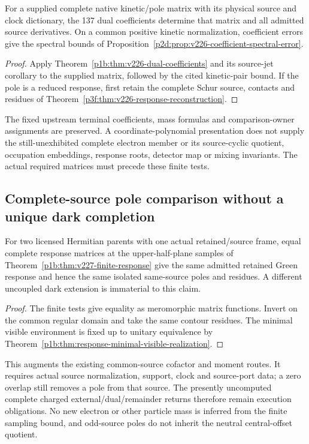 \documentclass[12pt,a4paper]{article}
\begin{document}
\begin{corollary}
\label{p5b:cor:v226-pole-coefficients}
For a supplied complete native kinetic/pole matrix with its physical source
and clock dictionary, the 137 dual coefficients determine that matrix and
all admitted source derivatives. On a common positive kinetic normalization,
coefficient errors give the spectral bounds of
Proposition~\ref{p2d:prop:v226-coefficient-spectral-error}.
\end{corollary}
\begin{proof}
Apply Theorem~\ref{p1b:thm:v226-dual-coefficients} and its source-jet
corollary to the supplied matrix, followed by the cited kinetic-pair bound.
If the pole is a reduced response, first retain the complete Schur source,
contacts and residues of Theorem~\ref{p3f:thm:v226-response-reconstruction}.
\end{proof}
The fixed upstream terminal coefficients, mass formulas and comparison-owner
assignments are preserved. A coordinate-polynomial presentation does not
supply the still-unexhibited complete electron member or its source-cyclic
quotient, occupation embeddings, response roots, detector map or mixing
invariants. The actual required matrices must precede these finite tests.


\subsection{Complete-source pole comparison without a unique dark completion}
\label{p5b:sec:v227-pole-comparison}
\begin{corollary}
\label{p5b:cor:v227-pole-comparison}
For two licensed Hermitian parents with one actual retained/source frame,
equal complete response matrices at the upper-half-plane samples of
Theorem~\ref{p1b:thm:v227-finite-response} give the same admitted retained
Green response and hence the same isolated same-source poles and residues.
A different uncoupled dark extension is immaterial to this claim.
\end{corollary}
\begin{proof}
The finite tests give equality as meromorphic matrix functions. Invert
on the common regular domain and take the same contour residues.
The minimal visible environment is fixed up to unitary equivalence by
Theorem~\ref{p1b:thm:response-minimal-visible-realization}.
\end{proof}
This augments the existing common-source cofactor and moment routes. It
requires actual source normalization, support, clock and source-port data;
a zero overlap still removes a pole from that source. The presently
uncomputed complete charged external/dual/remainder returns therefore
remain execution obligations. No new electron or other particle mass is
inferred from the finite sampling bound, and odd-source poles do not
inherit the neutral central-offset quotient.
\end{document}
